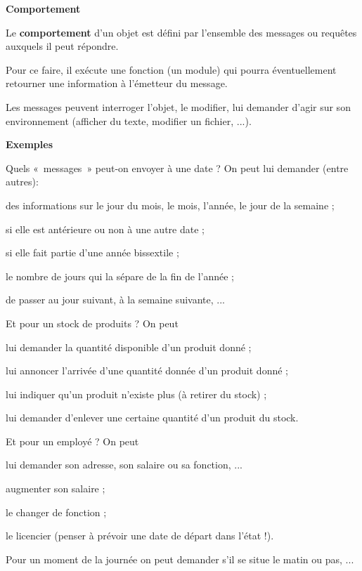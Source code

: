 \bigskip

{\sffamily\bfseries\upshape
Comportement}

{Le \textbf{comportement} d'un objet est défini par
l'ensemble des messages ou requêtes auxquels il peut
répondre.}

Pour ce faire, il exécute une fonction (un module) qui pourra
éventuellement retourner une information à l'émetteur
du message.

Les messages peuvent interroger l'objet, le modifier,
lui demander d'agir sur son environnement (afficher du
texte, modifier un fichier, ...). 

{
\textbf{Exemples} }

\begin{liste}
	\item {
		Quels «~messages~» peut-on envoyer à une date ? On peut lui demander
		(entre autres):}
			\begin{liste}
				\item {
					des informations sur le jour du mois, le mois, l'année,
					le jour de la semaine ; }
				\item {
					si elle est antérieure ou non à une autre date ;}
				\item {
					si elle fait partie d'une année bissextile ; }
				\item {
					le nombre de jours qui la sépare de la fin de l'année
					;}
				\item {
					de passer au jour suivant, à la semaine suivante, ...}
			\end{liste}
	\item 
		Et pour un stock de produits ? On peut 
		\begin{liste}
			\item {
				lui demander la quantité disponible d'un produit donné
				;}
			\item {
				lui annoncer l'arrivée d'une quantité
				donnée d'un produit donné ;}
			\item {
				lui indiquer qu'un produit n'existe
				plus (à retirer du stock) ;}
			\item {
				lui demander d'enlever une certaine quantité
				d'un produit du stock.}
		\end{liste}
	\item {
		Et pour un employé ? On peut}
		\begin{liste}
			\item {
				lui demander son adresse, son salaire ou sa fonction, ...}
			\item {
				augmenter son salaire ;}
			\item {
				le changer de fonction ;}
			\item {
				le licencier (penser à prévoir une date de départ dans
				l'état !).}
		\end{liste}
	\item {
		Pour un moment de la journée on peut demander s'il se
		situe le matin ou pas, ...}	
\end{liste}

